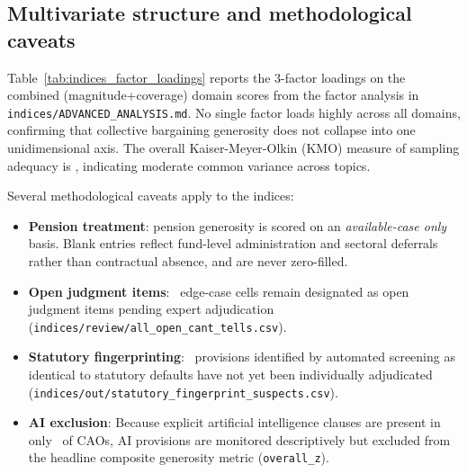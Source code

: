 \subsection*{Multivariate structure and methodological caveats}

Table~\ref{tab:indices_factor_loadings} reports the 3-factor loadings on the combined (magnitude+coverage) domain scores from the factor analysis in \texttt{indices/ADVANCED\_ANALYSIS.md}. No single factor loads highly across all domains, confirming that collective bargaining generosity does not collapse into one unidimensional axis. The overall Kaiser-Meyer-Olkin (KMO) measure of sampling adequacy is \IndKmoStat, indicating moderate common variance across topics.

\begin{table}[H]
    \centering
    \caption{Three-factor loadings on combined domain generosity scores}
    \label{tab:indices_factor_loadings}
    
\end{table}

Several methodological caveats apply to the indices:
\begin{itemize}
    \item \textbf{Pension treatment}: pension generosity is scored on an \emph{available-case only} basis. Blank entries reflect fund-level administration and sectoral deferrals rather than contractual absence, and are never zero-filled.
    \item \textbf{Open judgment items}: \IndOpenJudgmentCells\ edge-case cells remain designated as open judgment items pending expert adjudication (\texttt{indices/review/all\_open\_cant\_tells.csv}).
    \item \textbf{Statutory fingerprinting}: \IndFingerprintSuspects\ provisions identified by automated screening as identical to statutory defaults have not yet been individually adjudicated (\texttt{indices/out/statutory\_fingerprint\_suspects.csv}).
    \item \textbf{AI exclusion}: Because explicit artificial intelligence clauses are present in only \NonSalAiShare\ of CAOs, AI provisions are monitored descriptively but excluded from the headline composite generosity metric (\texttt{overall\_z}).
\end{itemize}

